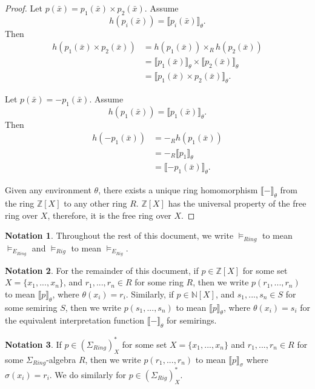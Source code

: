 \documentclass{msthesis}
\theoremstyle{definition}
\newtheorem*{notation}{Notation}
\newcommand{\semof}[1]{\llbracket{#1}\rrbracket}
\newcommand{\ints}{\mathbb{Z}}
\newcommand{\nat}{\mathbb{N}}
\begin{document}
\begin{proof}
\medskip

\noindent
Let $p(\bar{x}) = p_1(\bar{x}) \times p_2(\bar{x})$. Assume
\[
  h(p_i(\bar{x})) = \semof{p_i(\bar{x})}_\theta.
\]
Then
\begin{align*}
  h(p_1(\bar{x}) \times p_2(\bar{x}))
  &= h(p_1(\bar{x})) \times_R h(p_2(\bar{x})) \\
  &= \semof{p_1(\bar{x})}_\theta \times \semof{p_2(\bar{x})}_\theta \\
  &= \semof{p_1(\bar{x}) \times p_2(\bar{x})}_\theta.
\end{align*}

\medskip

\noindent
Let $p(\bar{x}) = -p_1(\bar{x})$. Assume
\[
  h(p_1(\bar{x})) = \semof{p_1(\bar{x})}_\theta.
\]
Then
\begin{align*}
  h(-p_1(\bar{x}))
  &= -_R h(p_1(\bar{x})) \\
  &= -_R \semof{p_1}_\theta \\
  &= \semof{-p_1(\bar{x})}_\theta.
\end{align*}

\medskip

\noindent
Given any environment $\theta$, there exists a unique ring homomorphism 
$\semof{-}_\theta$ from the ring $\ints[X]$ to any other ring $R$. 
$\ints[X]$ has the universal property of the free ring over $X$, therefore, 
it is the free ring over $X$.
\end{proof}

\begin{notation}
Throughout the rest of this document, we write $\models_{Ring}$ to mean $\models_{E_{Ring}}$ and $\models_{Rig}$ to mean $\models_{E_{Rig}}$.  
\end{notation}

\begin{notation}
    For the remainder of this document, if $p \in \ints[X]$ for some set $X = \{x_1, ..., x_n\}$, and $r_1, ..., r_n \in R$ for some ring $R$, then we write $p(r_1, ..., r_n)$ to mean $\semof{p}_\theta$, where $\theta(x_i) = r_i$. Similarly, if $p \in \nat[X]$, and $s_1, ..., s_n \in S$ for some semiring $S$, then we write $p(s_1, ..., s_n)$ to mean $\semof{p}_\theta$, where $\theta(x_i) = s_i$ for the equivalent interpretation function $\semof{-}_\theta$ for semirings.
\end{notation}

\begin{notation}
    If $p \in (\Sigma_{Ring})^*_X$ for some set $X = \{x_1, ..., x_n\}$ and $r_1, ..., r_n \in R$ for some $\Sigma_{Ring}$-algebra $R$, then we write $p(r_1, ..., r_n)$ to mean $\semof{p}_\sigma$ where $\sigma(x_i) = r_i$.  We do similarly for $p \in (\Sigma_{Rig})^*_X$.
\end{notation}
\end{document}
